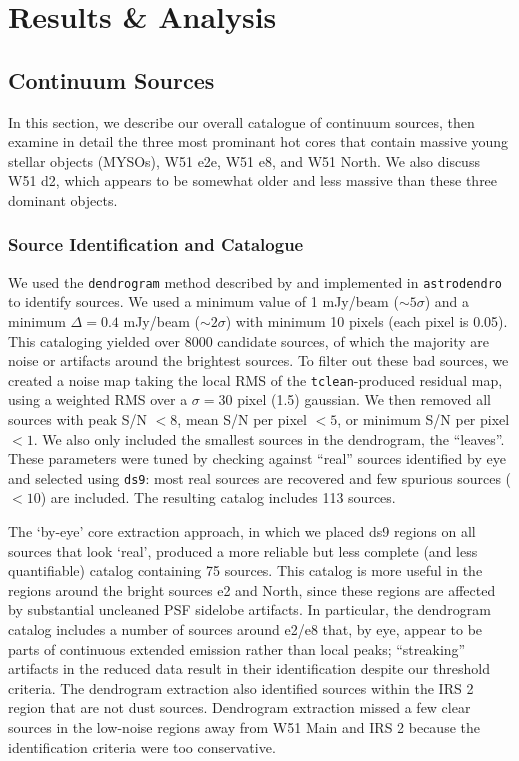 \documentclass{emulateapj}
\begin{document}
\section{Results \& Analysis}
\label{sec:results}

\subsection{Continuum Sources}
\label{sec:contsources}
In this section, we describe our overall catalogue of continuum sources,
then examine in detail the three most prominant hot cores that contain
massive young stellar objects (MYSOs), W51 e2e, W51 e8, and W51 North.
We also discuss W51 d2, which appears to be somewhat older and less massive
than these three dominant objects.

\subsubsection{Source Identification and Catalogue}
\label{sec:sourceid}
We used the \texttt{dendrogram} method described by \citet{Rosolowsky2008c} and
implemented in \texttt{astrodendro} to identify sources.  We used a minimum
value of 1 mJy/beam ($\sim5\sigma$) and a minimum $\Delta=0.4$ mJy/beam
($\sim2\sigma$) with minimum 10 pixels (each pixel is 0.05\arcsec).  This
cataloging yielded over 8000 candidate sources, of which the majority are noise
or artifacts around the brightest sources.  To filter out these bad sources,
we created a noise map taking the local RMS of the \texttt{tclean}-produced
residual map, using a weighted RMS over a $\sigma=30$ pixel (1.5\arcsec)
gaussian.  We then removed
all sources with peak S/N $< 8$, mean S/N per pixel $< 5$, or minimum S/N per
pixel $ < 1$.  We also only included the smallest sources in the dendrogram,
the ``leaves''.  These parameters were tuned by checking against ``real''
sources identified by eye and selected using \texttt{ds9}: most real sources are
recovered and few spurious sources ($<10$) are
included.  The resulting catalog includes 113 sources.

The `by-eye' core extraction approach, in which we placed ds9 regions on all
sources that look `real', produced a more reliable but less complete (and less
quantifiable) catalog containing 75 sources.  This catalog is more useful in
the regions around the bright sources e2 and North, since these regions are
affected by substantial uncleaned PSF sidelobe artifacts.  In particular, the
dendrogram catalog includes a number of sources around e2/e8 that, by eye,
appear to be parts of continuous extended emission rather than local peaks;
``streaking'' artifacts in the reduced data result in their identification
despite our threshold criteria.  The dendrogram extraction also identified
sources within the IRS 2 \hii region that are not dust sources.  Dendrogram
extraction missed a few clear sources in the low-noise regions away from
W51 Main and IRS 2 because the identification criteria were too conservative.
\end{document}

